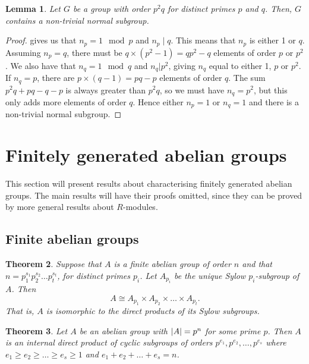\documentclass[12pt]{report}
\newcommand{\iso}{\cong}
\newtheorem{theorem}{Theorem}[section] %
\newtheorem{lemma}[theorem]{Lemma}
\theoremstyle{definition}
\begin{document}
\begin{lemma}
  Let \(G\) be a group with order \(p^{2}q\) for distinct primes \(p\) and \(q\). Then, \(G\) contains a non-trivial normal subgroup.
\end{lemma}

\begin{proof}
  gives us that \(n_{p} = 1 \mod p\) and \(n_{p} \mid q\). This means that \(n_{p}\) is either 1 or \(q\). Assuming \(n_{p} = q\), there must be \(q \times (p^{2}-1) = qp^{2} - q\) elements of order \(p\) or \(p^{2}\). We also have that \(n_{q} = 1 \mod q\) and \(n_{q} | p^{2}\), giving \(n_{q}\) equal to either 1, \(p\) or \(p^{2}\). If \(n_{q} = p\), there are \(p \times (q -1) = pq - p\) elements of order \(q\). The sum \(p^{2}q + pq -q -p\) is always greater than \(p^{2}q\), so we must have \(n_{q} = p^{2}\), but this only adds more elements of order \(q\). Hence either \(n_{p} =1 \) or \(n_{q} = 1\) and there is a non-trivial normal subgroup.
\end{proof}



\section{Finitely generated abelian groups}
This section will present results about characterising finitely generated abelian groups. The main results will have their proofs omitted, since they can be proved by more general results about \(R\)-modules.

\subsection{Finite abelian groups}

\begin{theorem}
  Suppose that \(A\) is a finite abelian group of order \(n\) and that \(n = p_{1}^{s_{1}}p_{2}^{s_{2}} \ldots p_{t}^{s_{t}}\), for distinct primes \(p_{i}\). Let \(A_{p_{i}}\) be the unique Sylow \(p_{i}\)-subgroup of \(A\). Then
  \[A \iso A_{p_{1}} \times A_{p_{2}} \times \ldots \times A_{p_{t}}.\]
  That is, \(A\) is isomorphic to the direct products of its Sylow subgroups.
\end{theorem}


\begin{theorem}
  Let \(A\) be an abelian group with \(\abs{A} = p^{n}\) for some prime \(p\). Then \(A\) is an internal direct product of cyclic subgroups of orders \(p^{e_{1}}, p^{e_{2}}, \ldots, p^{{e_{s}}}\) where \(e_{1} \geq e_{2} \geq \ldots \geq e_{s} \geq 1\) and \(e_{1} + e_{2} + \ldots + e_{s} = n\).
\end{theorem}
\end{document}
